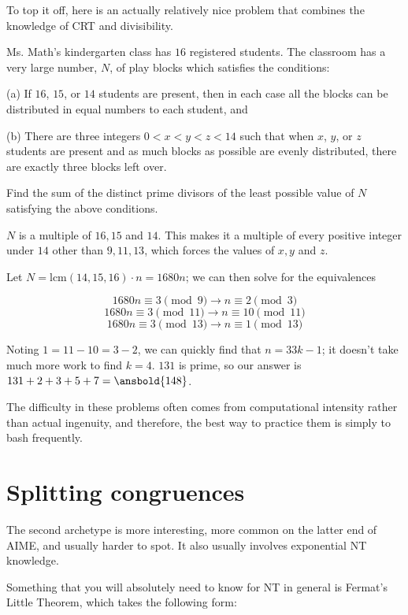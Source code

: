 \documentclass[mast]{lucky}
\begin{document}
To top it off, here is an actually relatively nice problem that combines the knowledge of CRT and divisibility.
\begin{exam}[AIME I 2013/11]
Ms. Math's kindergarten class has $16$ registered students. The classroom has a very large number, $N$, of play blocks which satisfies the conditions:

(a) If $16$, $15$, or $14$ students are present, then in each case all the blocks can be distributed in equal numbers to each student, and

(b) There are three integers $0 < x < y < z < 14$ such that when $x$, $y$, or $z$ students are present and as much blocks as possible are evenly distributed, there are exactly three blocks left over.

Find the sum of the distinct prime divisors of the least possible value of $N$ satisfying the above conditions.
\end{exam}
\begin{sol}
$N$ is a multiple of $16, 15$ and $14$. This makes it a multiple of every positive integer under $14$ other than $9, 11, 13$, which forces the values of $x, y$ and $z$.

Let $N=\text{lcm}(14,15,16)\cdot n=1680n$; we can then solve for the equivalences

\[1680n\equiv 3\pmod{9}\rightarrow n\equiv 2\pmod{3}\]
\[1680n\equiv 3\pmod{11}\rightarrow n\equiv 10\pmod{11}\]
\[1680n\equiv 3\pmod{13}\rightarrow n\equiv 1\pmod{13}\]

Noting $1=11-10=3-2$, we can quickly find that $n=33k-1$; it doesn't take much more work to find $k=4$. $131$ is prime, so our answer is $131+2+3+5+7=\ansbold{148}$.
\end{sol}
The difficulty in these problems often comes from computational intensity rather than actual ingenuity, and therefore, the best way to practice them is simply to bash frequently.
\pagebreak

\section{Splitting congruences}

The second archetype is more interesting, more common on the latter end of AIME, and usually harder to spot. It also usually involves exponential NT knowledge.

Something that you will absolutely need to know for NT in general is Fermat's Little Theorem, which takes the following form:
\end{document}
